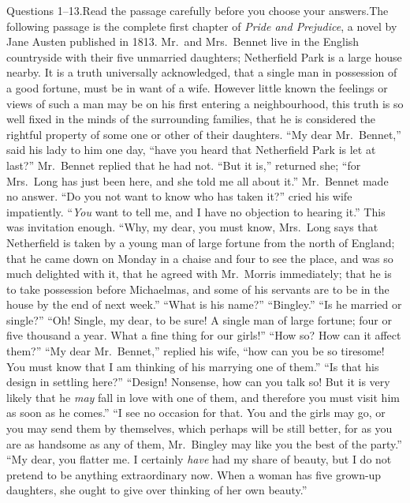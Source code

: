 \documentclass[11pt]{article}
\begin{document}
\begin{passage}{Questions 1--13.\quad Read the passage carefully before you choose your answers.}{The following passage is the complete first chapter of \emph{Pride and Prejudice}, a novel by Jane Austen published in 1813. Mr.\ and Mrs.\ Bennet live in the English countryside with their five unmarried daughters; Netherfield Park is a large house nearby.}
\pp It is a truth universally acknowledged, that a single man in possession of a good fortune, must be in want of a wife.
\pp However little known the feelings or views of such a man may be on his first entering a neighbourhood, this truth is so well fixed in the minds of the surrounding families, that he is considered the rightful property of some one or other of their daughters.
\pp ``My dear Mr.\ Bennet,'' said his lady to him one day, ``have you heard that Netherfield Park is let at last?''
\pp Mr.\ Bennet replied that he had not.
\pp ``But it is,'' returned she; ``for Mrs.\ Long has just been here, and she told me all about it.''
\pp Mr.\ Bennet made no answer.
\pp ``Do you not want to know who has taken it?'' cried his wife impatiently.
\pp ``\emph{You} want to tell me, and I have no objection to hearing it.''
\pp This was invitation enough.
\pp ``Why, my dear, you must know, Mrs.\ Long says that Netherfield is taken by a young man of large fortune from the north of England; that he came down on Monday in a chaise and four to see the place, and was so much delighted with it, that he agreed with Mr.\ Morris immediately; that he is to take possession before Michaelmas, and some of his servants are to be in the house by the end of next week.''
\pp ``What is his name?''
\pp ``Bingley.''
\pp ``Is he married or single?''
\pp ``Oh! Single, my dear, to be sure! A single man of large fortune; four or five thousand a year. What a fine thing for our girls!''
\pp ``How so? How can it affect them?''
\pp ``My dear Mr.\ Bennet,'' replied his wife, ``how can you be so tiresome! You must know that I am thinking of his marrying one of them.''
\pp ``Is that his design in settling here?''
\pp ``Design! Nonsense, how can you talk so! But it is very likely that he \emph{may} fall in love with one of them, and therefore you must visit him as soon as he comes.''
\pp ``I see no occasion for that. You and the girls may go, or you may send them by themselves, which perhaps will be still better, for as you are as handsome as any of them, Mr.\ Bingley may like you the best of the party.''
\pp ``My dear, you flatter me. I certainly \emph{have} had my share of beauty, but I do not pretend to be anything extraordinary now. When a woman has five grown-up daughters, she ought to give over thinking of her own beauty.''

\end{passage}
\end{document}
